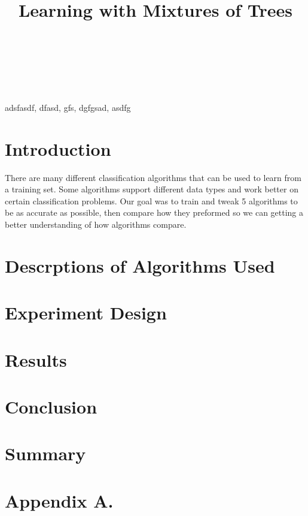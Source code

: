 \documentclass[twoside,11pt]{article}
\begin{document}
\title{Learning with Mixtures of Trees}

\author{  \\
       \AND
         \\
       \AND
         \\
       }


\maketitle

\begin{abstract}%

\end{abstract}

\begin{keywords}
  adsfasdf, dfasd, gfs, dgfgsad, asdfg
\end{keywords}

\section{Introduction}
There are many different classification algorithms that can be used to learn from a training set. Some algorithms support different data types and work better on certain classification problems. Our goal was to train and tweak 5 algorithms to be as accurate as possible, then compare how they preformed so we can getting a better understanding of how algorithms compare.

\section{Descrptions of Algorithms Used}

\section{Experiment Design}

\section{Results}

\section{Conclusion}

\section{Summary}

\appendix
\section*{Appendix A.}

% 
\end{document}
